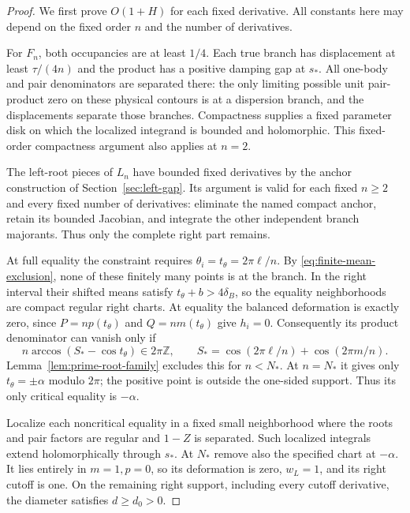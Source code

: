 \documentclass[11pt]{article}
\numberwithin{equation}{section}
\theoremstyle{remark}\newtheorem{remark}[theorem]{Remark}
\begin{document}
\begin{proof}
We first prove $O(1+H)$ for each fixed derivative. All
constants here may depend on the fixed order $n$ and the
number of derivatives.

For $F_n$, both occupancies are at least $1/4$. Each true
branch has displacement at least $\tau/(4n)$ and the product
has a positive damping gap at $s_*$. All one-body and pair
denominators are separated there: the only limiting possible
unit pair-product zero on these physical contours is at a
dispersion branch, and the displacements separate those
branches. Compactness supplies a fixed parameter disk on
which the localized integrand is bounded and holomorphic.
This fixed-order compactness argument also applies at $n=2$.

The left-root pieces of $L_n$ have bounded fixed derivatives
by the anchor construction of Section~\ref{sec:left-gap}.
Its argument is valid for each fixed $n\ge2$ and every
fixed number of derivatives: eliminate the named compact
anchor, retain its bounded Jacobian, and integrate the other
independent branch majorants. Thus only the complete right
part remains.

At full equality the constraint requires
$\theta_i=t_\theta=2\pi\ell/n$. By
\eqref{eq:finite-mean-exclusion}, none of these finitely many
points is at the branch. In the right interval their shifted
means satisfy $t_\theta+b>4\delta_B$, so the equality
neighborhoods are compact regular right charts. At equality
the balanced deformation is exactly zero, since
$P=np(t_\theta)$ and $Q=nm(t_\theta)$ give $h_i=0$.
Consequently its product denominator can vanish only if
\[
 n\arccos(S_*-\cos t_\theta)\in2\pi\mathbb Z,
 \qquad
 S_* = \cos(2\pi\ell/n)+\cos(2\pi m/n).
\]
Lemma~\ref{lem:prime-root-family} excludes this for $n<N_*$.
At $n=N_*$ it gives only $t_\theta=\pm\alpha$ modulo
$2\pi$; the positive point is outside the one-sided support.
Thus its only critical equality is $-\alpha$.

Localize each noncritical equality in a fixed small
neighborhood where the roots and pair factors are regular
and $1-Z$ is separated. Such localized integrals extend
holomorphically through $s_*$. At $N_*$ remove also the
specified chart at $-\alpha$. It lies entirely in $m=1,p=0$,
so its deformation is zero, $w_L=1$, and its right cutoff
is one. On the remaining right support, including every
cutoff derivative, the diameter satisfies $d\ge d_0>0$.


\end{proof}
\end{document}
